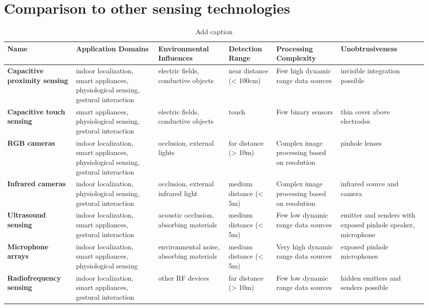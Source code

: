 \section{Comparison to other sensing technologies}

\begin{table}[htbp]
  \centering
  \footnotesize
  \caption{Add caption}
    \begin{tabularx}{\linewidth}{Xp{4cm}XXXX}
    \toprule
    \textbf{Name} & \textbf{Application Domains} & \textbf{Environmental Influences} & \textbf{Detection Range} & \textbf{Processing Complexity} & \textbf{Unobtrusiveness} \\
    \midrule
    \textbf{Capacitive proximity sensing} & indoor localization, smart appliances, physiological sensing, gestural interaction & electric fields, conductive objects & near distance   (< 100cm) & Few high dynamic range data sources  & invisible integration possible \\ \addlinespace
    \textbf{Capacitive touch sensing} & smart appliances, physiological sensing, gestural interaction & electric fields, conductive objects & touch  & Few binary sensors & thin cover above electrodes \\ \addlinespace
    \textbf{RGB cameras } & indoor localization, smart appliances, physiological sensing, gestural interaction & occlusion, external lights & far distance     (> 10m) & Complex image processing based on resolution & pinhole lenses \\ \addlinespace
    \textbf{Infrared cameras} & indoor localization, physiological sensing, gestural interaction & occlusion, external infrared light & medium distance (< 5m) & Complex image processing based on resolution & infrared source and camera \\ \addlinespace
    \textbf{Ultrasound sensing} & indoor localization, smart appliances, gestural interaction & acoustic occlusion, absorbing materials & medium distance (< 5m) & Few low dynamic range data sources & emitter and senders with exposed pinhole speaker, microphone \\ \addlinespace
    \textbf{Microphone arrays} & indoor localization, smart appliances, physiological sensing & environmental noise, absorbing materials & medium distance (< 5m) & Very high dynamic range data sources & exposed pinhole microphones \\ \addlinespace
    \textbf{Radiofrequency sensing} & indoor localization, smart appliances, gestural interaction & other RF devices & far distance     (> 10m) & Few low dynamic range data sources & hidden emitters and senders possible \\
    \bottomrule
    \end{tabularx}%
  \label{tab:addlabel}%
\end{table}%



